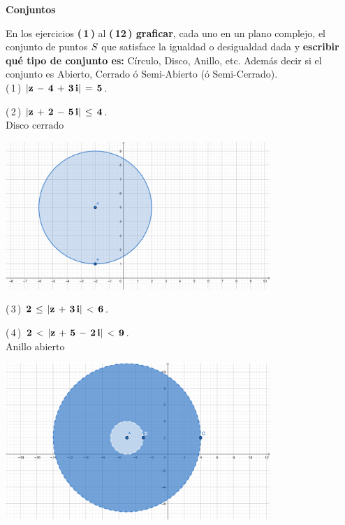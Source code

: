 \documentclass[a4paper,11pt,openany]{book}
\begin{document}
\newpage


\graphicspath{ {images/} }

\begin{center}
\textbf{Conjuntos}
\end{center}

En los ejercicios \textbf{(\,1\,)} al \textbf{(\,12\,) graficar}, cada uno en un plano complejo, el conjunto de puntos $\mathnormal{S}$ que satisface la igualdad o desigualdad dada y \textbf{escribir qué tipo de conjunto es:} Círculo, Disco, Anillo, etc. Además decir si el conjunto es Abierto, Cerrado ó Semi-Abierto (ó Semi-Cerrado).\\

\textcolor{ao(english)}{(\,1\,)} $\bf{|z\,-\,4\,+\,3\,i|\,=\,5}$.

\textcolor{ao(english)}{(\,2\,)} $\bf{|z\,+\,2\,-\,5\,i|\,\leq\,4}$.\\
$\text{Disco cerrado}$

\begin{center}
    \includegraphics[width=10cm]{Gra-Ej-2.png}
\end{center}

\textcolor{ao(english)}{(\,3\,)} $\bf{2\,\leq\,|z\,+\,3\,i|\,<\,6}$.

\textcolor{ao(english)}{(\,4\,)} $\bf{2\,<\,|z\,+\,5\,-\,2\,i|\,<\,9}$.\\
$\text{Anillo abierto}$

\begin{center}
    \includegraphics[width=10cm]{Gra-Ej-4.png}
\end{center}
\end{document}
